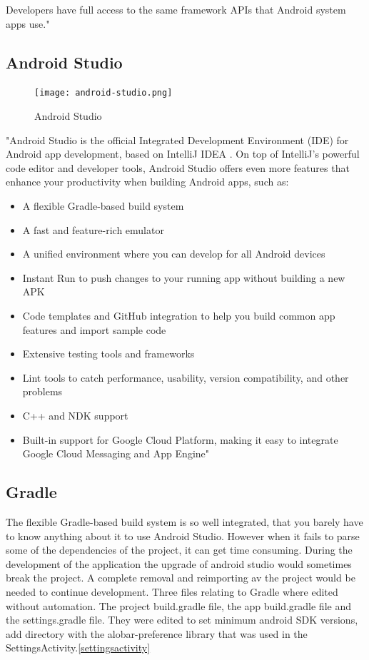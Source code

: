  Developers have full access to the same framework APIs that Android system apps use."~\cite{android_developers_2018}
 
 
 \subsection{Android Studio}
 
 \begin{figure}[!htb]
 	\centering
 	\texttt{[image: android-studio.png]}
 	\caption{Android Studio \label{android-studio}}
 \end{figure}
"Android Studio is the official Integrated Development Environment (IDE) for Android app development, based on IntelliJ IDEA . On top of IntelliJ's powerful code editor and developer tools, Android Studio offers even more features that enhance your productivity when building Android apps, such as:
\begin{itemize}
\item A flexible Gradle-based build system
\item A fast and feature-rich emulator
\item A unified environment where you can develop for all Android devices
\item Instant Run to push changes to your running app without building a new APK
\item Code templates and GitHub integration to help you build common app features and import sample code
\item Extensive testing tools and frameworks
\item Lint tools to catch performance, usability, version compatibility, and other problems
\item C++ and NDK support
\item Built-in support for Google Cloud Platform, making it easy to integrate Google Cloud Messaging and App Engine"\cite{android_studio}
\end{itemize}
 \subsection{Gradle}
 The flexible Gradle-based build system is so well integrated, that you barely have to know anything about it to use Android Studio. However when it fails to parse some of the dependencies of the project, it can get time consuming. During the development of the application the upgrade of android studio would sometimes break the project. A complete removal and reimporting av the project would be needed to continue development. Three files relating to Gradle where edited without automation. The project build.gradle file, the app build.gradle file and the settings.gradle file. They were edited to set minimum android SDK versions, add directory with the alobar-preference\cite{alobar} library that was used in the SettingsActivity.\ref{settingsactivity}
 
